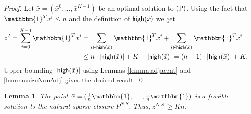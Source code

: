 \documentclass[smallextended]{svjour3}
\newtheorem{lemma}[proposition]{Lemma}
\begin{document}
	\begin{proof}
		Let $\bar{x} = (\bar{x}^0, \ldots, \bar{x}^{K-1})$ be an optimal solution to $(\textup{P})$. Using the fact that ${\mathbbm{1}}^T \bar{x}^i \le n$ and the definition of ${{\sf high}}(\bar{x})$ we get
		\begin{align*}
	z^I = \sum_{i= 0}^{K-1} {\mathbbm{1}}^T \bar{x}^i &= \sum_{i \in {{\sf high}}(\bar{x})} {\mathbbm{1}}^T \bar{x}^i + \sum_{i \notin {{\sf high}}(\bar{x})} {\mathbbm{1}}^T \bar{x}^i \\
	&\le n \cdot |{{\sf high}}(\bar{x})| + K - |{{\sf high}}(\bar{x})| = (n-1) \cdot |{{\sf high}}(\bar{x})| + K.
	\end{align*}	
	Upper bounding $|{{\sf high}}(\bar{x})|$ using Lemmas \ref{lemma:adjacent} and \ref{lemma:sizeNonAdj} gives the desired result.{
\ifmp
	\hfill \qed
\fi
}
	\end{proof}

	\begin{lemma} \label{lemma:LBNS2}
		The point $\bar{x} = (\frac{1}{n} {\mathbbm{1}}, \ldots, \frac{1}{n} {\mathbbm{1}})$ is a feasible solution to the natural sparse closure $P^{N.S}$. Thus, $z^{N.S.} \ge K n$.
	\end{lemma}
	
\end{document}
